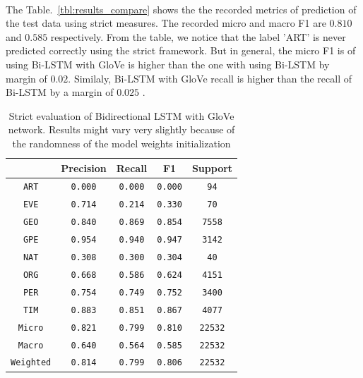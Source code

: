 \documentclass[sigconf, nonacm, natbib, screen, balance=False]{acmart}
\begin{document}
\hfill\\
The Table.~\ref{tbl:results_compare} shows the the recorded metrics of prediction of the test data using strict measures. The recorded micro and macro F1 are $0.810$ and $0.585$ respectively. From the table, we notice that the label 'ART' is never predicted correctly using the strict framework. But in general, the micro F1 is of using Bi-LSTM with GloVe is higher than the one with using Bi-LSTM by margin of $0.02$. Similaly, Bi-LSTM with GloVe recall is higher than the recall of Bi-LSTM by a margin of $0.025$ .
\begin{table}
  \caption{Strict evaluation of Bidirectional LSTM with GloVe network. Results might vary very slightly because of the randomness of the model weights initialization}
  \label{tbl:lstm_glove_results}
  \begin{tabular}{c|c|c|c|c}  
    \hline
    & Precision & Recall & F1 & Support \\\hline
    \verb!ART! & \verb!0.000! &  \verb!0.000! & \verb!0.000! & \verb!94! \\
    \verb!EVE! & \verb!0.714!  & \verb!0.214! & \verb!0.330! & \verb!70! \\
    \verb!GEO! & \verb!0.840!  & \verb!0.869! & \verb!0.854! & \verb!7558! \\
    \verb!GPE! & \verb!0.954!  & \verb!0.940! & \verb!0.947! & \verb!3142! \\
    \verb!NAT! & \verb!0.308!  & \verb!0.300! & \verb!0.304! & \verb!40! \\
    \verb!ORG! & \verb!0.668!  & \verb!0.586! & \verb!0.624! & \verb!4151! \\
    \verb!PER! & \verb!0.754!  & \verb!0.749! & \verb!0.752! & \verb!3400! \\
    \verb!TIM! & \verb!0.883!  & \verb!0.851! & \verb!0.867! & \verb!4077! \\\hline
    \verb!Micro! & \verb!0.821!  & \verb!0.799! & \verb!0.810! & \verb!22532! \\
    \verb!Macro! & \verb!0.640!  & \verb!0.564! & \verb!0.585! & \verb!22532! \\
    \verb!Weighted! & \verb!0.814!  & \verb!0.799! & \verb!0.806! & \verb!22532! \\\hline
  \end{tabular}
\end{table}
\end{document}
